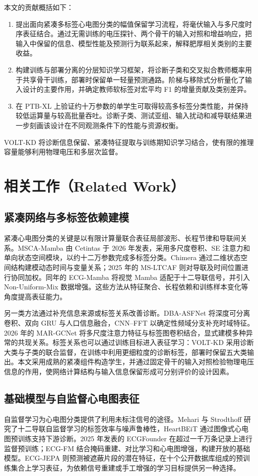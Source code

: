 \documentclass[11pt,a4paper,UTF8,fontset=windows]{ctexart}
\begin{document}
本文的贡献概括如下：
\begin{enumerate}
\item 提出面向紧凑多标签心电图分类的幅值保留学习流程，将毫伏输入与多尺度时序表征结合。通过无需训练的电压探针、两个骨干的输入对照和增益响应，把输入中保留的信息、模型性能及预测行为联系起来，解释肥厚相关类别的主要收益。
\item 构建训练与部署分离的分层知识学习框架，将诊断子类和交叉拟合教师概率用于共享骨干训练，部署时保留单一轻量预测通路。阶梯与移除式分析量化了输入设计的主要作用，并确定教师软标签对宏平均 F1 的增量贡献及类别差异。
\item 在 PTB-XL 上验证约十万参数的单学生可取得较高多标签分类性能，并保持较低运算量与较高批量吞吐。诊断子类、测试亚组、输入扰动和减导联结果进一步刻画该设计在不同观测条件下的性能与资源权衡。
\end{enumerate}

VOLT-KD 将诊断信息保留、紧凑特征提取与训练期知识学习结合，使有限的推理容量能够利用物理电压和多层次监督。
\section{相关工作（Related Work）}
\subsection{紧凑网络与多标签依赖建模}
紧凑心电图分类的关键是以有限计算量联合表征局部波形、长程节律和导联间关系。MSCA-Mamba 由 Cetintas 于 2026 年发表，采用多尺度卷积、SE 注意力和单向状态空间模块，以约十二万参数完成多标签分类\cite{cetintas2026}。Chimera 通过二维状态空间结构建模动态时间与变量关系\cite{behrouz2024}；2025 年的 MS-LTCAF 则对导联及时间位置进行协同加权\cite{feng2025}。同年的 ECG-Mamba 将视觉 Mamba 适配于十二导联信号，并引入 Non-Uniform-Mix 数据增强\cite{jiang2025}。这些方法从特征聚合、长程依赖和训练样本变化等角度提高表征能力。

另一类方法通过补充信息来源或标签关系改善诊断。DBA-ASFNet 将深度可分离卷积、双向 GRU 与人口信息融合\cite{luo2025}，CNN--FFT 以确定性频域分支补充时域特征\cite{malik2026}。2026 年的 MAR-GCNet 将多尺度注意力特征与标签图卷积结合，显式建模多种异常的共现关系\cite{luomar2026}。标签关系也可以通过训练目标进入表征学习：VOLT-KD 采用诊断大类与子类的联合监督，在训练中利用更细粒度的诊断标签，部署时保留五大类输出。本文采用成熟的紧凑组件构造学生，并通过固定骨干的输入对照检验物理电压信息的作用，使网络计算结构与输入信息保留形成可分别评价的设计因素。

\subsection{基础模型与自监督心电图表征}
自监督学习为心电图分类提供了利用未标注信号的途径。Mehari 与 Strodthoff 研究了十二导联自监督学习的标签效率与噪声鲁棒性\cite{mehari2022}，HeartBEiT 通过图像式心电图预训练支持下游诊断\cite{vaid2023}。2025 年发表的 ECGFounder 在超过一千万条记录上进行监督预训练\cite{li2025}；ECG-FM 结合掩码重建、对比学习和心电图增强，构建开放的基础模型\cite{mckeen2025}。ECG-JEPA 则预测被遮蔽片段的潜在特征，在十个公开数据库组成的预训练集合上学习表征，为依赖信号重建或手工增强的学习目标提供另一种选择\cite{weimann2025}。
\end{document}
